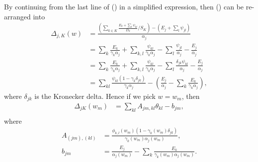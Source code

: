 \documentclass[12pt]{article}
\def\D{\displaystyle}
\begin{document}
By continuing from the last line of () in a simplified expression, then () can be re-arranged into
\begin{equation}
    \label{eq:delta_split}
    \begin{split}
        \Delta_{j,K}(w)&= \frac{\D \left(\sum_{k\in K} \frac{E_k + \sum_l \psi_{kl}}{D_k} / S_K\right) - \left(E_j + \sum_l \psi_{jl}\right)}{\alpha_j} \\
        &= \sum_k \frac{E_k}{\gamma_k\alpha_j} + \sum_{k,l} \frac{\psi_{kl}}{\gamma_k\alpha_j} - \sum_{l} \frac{\psi_{jl}}{\alpha_j} - \frac{E_j}{\alpha_j}\\
        &= \sum_k \frac{E_k}{\gamma_k\alpha_j} + \sum_{k,l} \frac{\psi_{kl}}{\gamma_k\alpha_j} - \sum_{l} \frac{\delta_{jk}\psi_{kl}}{\alpha_j} - \frac{E_j}{\alpha_j}\\
        &= \sum_{kl} \frac{\psi_{kl} (1-\gamma_k\delta_{jk})}{\gamma_k\alpha_j} - \left(\frac{E_j}{\alpha_j} - \sum_k\frac{E_k}{\gamma_k\alpha_j}\right),
    \end{split}
\end{equation}
where $\delta_{jk}$ is the Kronecker delta. Hence if we pick $w = w_m$, then
\begin{equation}
	\begin{split}
		\Delta_{jK}(w_m) &= \sum_{kl} A_{jm, kl} \theta_{kl} - b_{jm}, \\
	\end{split}	
\end{equation}
where
\begin{equation}
	\begin{split}
		A_{(jm), (kl)} &= \frac{\phi_{k,l}(w_m)(1 - \gamma_k(w_m) \delta_{jk})}{\gamma_k(w_m) \alpha_j(w_m)},\\
		b_{jm} &= \frac{E_j}{\alpha_j(w_m)} - \sum_k\frac{E_k}{\gamma_k(w_m)  \alpha_j(w_m)}.
	\end{split}
\end{equation}
\end{document}
